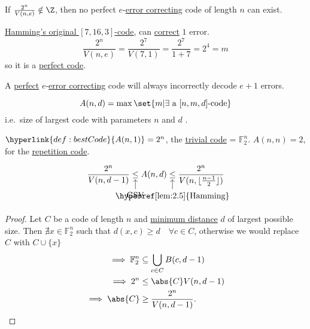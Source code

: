 \documentclass{article}
\DeclarePairedDelimiter{\floor}{\lfloor}{\rfloor}
\newcommand{\1}[1]{\mathbbm{1}_{#1}}
\begin{document}
\begin{remark}
    If $\frac{2^n}{V(n, e)} \notin \Z$, then no perfect $e$-\hyperlink{def:errorCor}{error correcting} code of length $n$ can exist.
\end{remark}
\begin{eg}
    \hyperlink{def:hammingCode}{Hamming's original $[7,16,3]$-code}, can \hyperlink{def:errorCor}{correct} $1$ error.
    \begin{equation*}
        \frac{2^n}{V(n, e)} = \frac{2^7}{V(7, 1)} = \frac{2^7}{1 + 7} = 2^4 = m
    \end{equation*}
    so it is a \hyperlink{def:perfect}{perfect code}.
\end{eg}
\begin{remark}
    A \hyperlink{def:perfect}{perfect} $e$-\hyperlink{def:errorCor}{error correcting} code will always incorrectly decode $e+1$ errors.
\end{remark}
\begin{defi}
    \begin{equation*}
        A(n, d) = \max\set{m | \exists \text{ a } [n, m, d]\text{-code}}
    \end{equation*}
    i.e.\ size of largest code with parameters $n$ and $d$ .
\end{defi}
\begin{eg}
    $\hyperlink{def:bestCode}{A(n, 1)} = 2^n$, the \hyperlink{def:trivialCode}{trivial code} = $\mathbb{F}_2^n$. $A(n, n) = 2$, for the \hyperlink{def:repetitionCode}{repetition code}.
\end{eg}
\begin{nprop}\label{prop:2.6}
    \begin{equation*}
        \frac{2^n}{V(n, d-1)} \underset{\mathclap{
            \begin{tikzpicture}
                \node[below] (A) at (0, 0) {GSV};
                \draw[->] (A) to (0, 0.4);
            \end{tikzpicture}
        }}{\leq} A(n, d)
        \underset{\mathclap{
            \begin{tikzpicture}
                \node[below] (A) at (0, 0) {\hyperref[lem:2.5]{Hamming}};
                \draw[->] (A) to (0, 0.4);
            \end{tikzpicture}
        }}{\leq}
        \frac{2^n}{V(n, \floor{\frac{n-1}{2}})}
    \end{equation*}
\end{nprop}
\begin{proof}
    Let $C$ be a code of length $n$ and \hyperlink{def:minimumDistanceCode}{minimum distance} $d$ of largest possible size.
    Then $\nexists x \in \mathbb{F}_2^n$ such that $d(x, c) \geq d \quad \forall c \in C$, otherwise we would replace $C$ with $C \cup \{x\}$
    \begin{align*}
        \implies \mathbb{F}_2^n &\subseteq \bigcup_{c \in C}B(c, d-1) \\
        \implies 2^n &\leq \abs{C} V(n, d-1) \\
        \implies \abs{C} &\geq \frac{2^n}{V(n, d-1)}. \qedhere
    \end{align*}
\end{proof}
\end{document}
